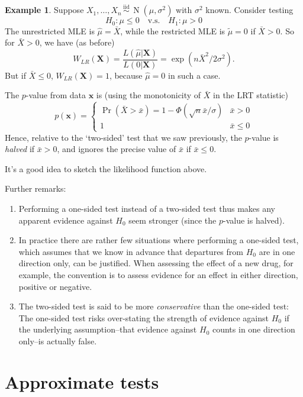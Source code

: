 \documentclass[
]{book}
\newcommand{\bx}{{\boldsymbol x}}
\newcommand{\bX}{{\boldsymbol X}}
\DeclareMathOperator{\N}{N}
\newcommand{\iid}{\,\overset{\text{iid}}{\sim}\,}
\theoremstyle{definition}
\theoremstyle{definition}
\newtheorem{example}{Example}[chapter]
\theoremstyle{definition}
\theoremstyle{definition}
\theoremstyle{remark}
\begin{document}
\begin{example}
Suppose \(X_1,\dots,X_n\iid\N(\mu,\sigma^2)\) with \(\sigma^2\) known. Consider testing
\[
H_0: \mu \leq 0 \hspace{1em}\text{v.s.}\hspace{1em} H_1: \mu > 0
\]
The unrestricted MLE is \(\hat\mu=\bar X\), while the restricted MLE is \(\tilde\mu=0\) if \(\bar X>0\). So for \(\bar X > 0\), we have (as before)
\[
W_{LR}(\bX) = \frac{L(\hat\mu|\bX)}{L(0|\bX)} = \exp\left(n\bar X^2/2\sigma^2\right).
\]
But if \(\bar X\leq 0\), \(W_{LR}(\bX)=1\), because \(\hat\mu=0\) in such a case.

The \(p\)-value from data \(\bx\) is (using the monotonicity of \(\bar X\) in the LRT statistic)
\[
p(\bx) = \begin{cases}
\Pr(\bar X > \bar x) = 1-\Phi(\sqrt n \bar x / \sigma) &\bar x > 0 \\
1 &\bar x \leq 0
\end{cases}
\]
Hence, relative to the `two-sided' test that we saw previously, the \(p\)-value is \emph{halved} if \(\bar x > 0\), and ignores the precise value of \(\bar x\) if \(\bar x \leq 0\).
\end{example}

It's a good idea to sketch the likelihood function above.

Further remarks:

\begin{enumerate}
\def\labelenumi{\arabic{enumi}.}
\item
  Performing a one-sided test instead of a two-sided test thus makes any apparent evidence against \(H_0\) seem stronger (since the \(p\)-value is halved).
\item
  In practice there are rather few situations where performing a one-sided test, which assumes that we know in advance that departures from \(H_0\) are in one direction only, can be justified. When assessing the effect of a new drug, for example, the convention is to assess evidence for an effect in either direction, positive or negative.
\item
  The two-sided test is said to be more \emph{conservative} than the one-sided test: The one-sided test risks over-stating the strength of evidence against \(H_0\) if the underlying assumption--that evidence against \(H_0\) counts in one direction only--is actually false.
\end{enumerate}

\hypertarget{approximate-tests}{%
\section{Approximate tests}\label{approximate-tests}}
\end{document}
